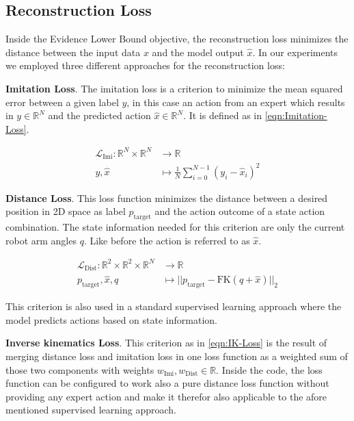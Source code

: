 \subsection{Reconstruction Loss}

Inside the Evidence Lower Bound objective, the reconstruction loss minimizes the distance between the input data $x$ and the model output $\hat{x}$. In our experiments we employed three different approaches for the reconstruction loss:

\textbf{Imitation Loss}. The imitation loss is a criterion to minimize the mean squared error between a given label $y$, in this case an action from an expert which results in $y \in \mathbb{R}^N$ and the predicted action $\hat{x} \in \mathbb{R}^N$. It is defined as in \eqref{eqn:Imitation-Loss}.

\begin{equation}\label{eqn:Imitation-Loss}
    \begin{split}
        \mathcal{L}_\text{Imi}: \mathbb{R}^N \times \mathbb{R}^N & \to \mathbb{R} \\
        y, \hat{x} & \mapsto \frac{1}{N}\sum_{i = 0}^{N-1} (y_i - \hat{x}_i)^2 
    \end{split}
\end{equation}

\textbf{Distance Loss}. This loss function minimizes the distance between a desired position in 2D space as label $p_\text{target}$ and the action outcome of a state action combination. The state information needed for this criterion are only the current robot arm angles $q$. Like before the action is referred to as $\hat{x}$.

\begin{equation}\label{eqn:Distance-Loss}
    \begin{split}
        \mathcal{L}_\text{Dist}: \mathbb{R}^2 \times \mathbb{R}^2 \times \mathbb{R}^N & \to \mathbb{R} \\
        p_\text{target}, \hat{x}, q & \mapsto ||p_\text{target} - \text{FK}(q + \hat{x})||_2
    \end{split}
\end{equation}

This criterion is also used in a standard supervised learning approach where the model predicts actions based on state information.

\textbf{Inverse kinematics Loss}. This criterion as in \eqref{eqn:IK-Loss} is the result of merging distance loss and imitation loss in one loss function as a weighted sum of those two components with weights $w_\text{Imi}, w_\text{Dist} \in \mathbb{R}$. Inside the code, the loss function can be configured to work also a pure distance loss function without providing any expert action and make it therefor also applicable to the afore mentioned supervised learning approach. 

